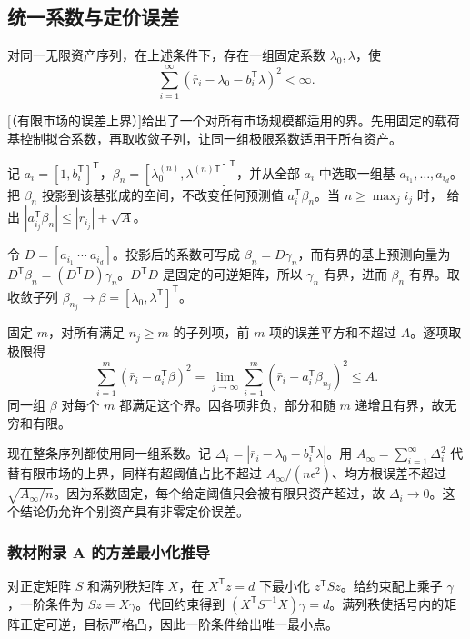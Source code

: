 \subsection{统一系数与定价误差}
\begin{tcolorbox}[knowledge]
 对同一无限资产序列，在上述条件下，存在一组固定系数 $\lambda_0,\lambda$，使
\[
 \sum_{i=1}^\infty(\bar r_i-\lambda_0-b_i^{\mathsf T}\lambda)^2<\infty.
\]
\end{tcolorbox}

[（有限市场的误差上界）]给出了一个对所有市场规模都适用的界。先用固定的载荷基控制拟合系数，再取收敛子列，让同一组极限系数适用于所有资产。

\begin{solution}[label-content={证明},blank-type=none]
记 $a_i=[1,b_i^{\mathsf T}]^{\mathsf T}$，$\beta_n=[\lambda_0^{(n)},\lambda^{(n)\mathsf T}]^{\mathsf T}$，并从全部 $a_i$ 中选取一组基 $a_{i_1},\ldots,a_{i_d}$。把 $\beta_n$ 投影到该基张成的空间，不改变任何预测值 $a_i^{\mathsf T}\beta_n$。当 $n\ge\max_j i_j$ 时， 给出 $|a_{i_j}^{\mathsf T}\beta_n|\le|\bar r_{i_j}|+\sqrt A$。

令 $D=[a_{i_1}\ \cdots\ a_{i_d}]$。投影后的系数可写成 $\beta_n=D\gamma_n$，而有界的基上预测向量为 $D^{\mathsf T}\beta_n=(D^{\mathsf T}D)\gamma_n$。$D^{\mathsf T}D$ 是固定的可逆矩阵，所以 $\gamma_n$ 有界，进而 $\beta_n$ 有界。取收敛子列 $\beta_{n_j}\to\beta=[\lambda_0,\lambda^{\mathsf T}]^{\mathsf T}$。

固定 $m$，对所有满足 $n_j\ge m$ 的子列项，前 $m$ 项的误差平方和不超过 $A$。逐项取极限得
\[
 \sum_{i=1}^m(\bar r_i-a_i^{\mathsf T}\beta)^2
 =\lim_{j\to\infty}\sum_{i=1}^m(\bar r_i-a_i^{\mathsf T}\beta_{n_j})^2\le A.
\]
同一组 $\beta$ 对每个 $m$ 都满足这个界。因各项非负，部分和随 $m$ 递增且有界，故无穷和有限。
\end{solution}

现在整条序列都使用同一组系数。记 $\Delta_i=|\bar r_i-\lambda_0-b_i^{\mathsf T}\lambda|$。用 $A_\infty=\sum_{i=1}^{\infty}\Delta_i^2$ 代替有限市场的上界，同样有超阈值占比不超过 $A_\infty/(n\epsilon^2)$、均方根误差不超过 $\sqrt{A_\infty/n}$。因为系数固定，每个给定阈值只会被有限只资产超过，故 $\Delta_i\to0$。这个结论仍允许个别资产具有非零定价误差。

\subsubsection{教材附录 A 的方差最小化推导}
\begin{tcolorbox}[knowledge,title={等式约束下的二次最小化}]
对正定矩阵 $S$ 和满列秩矩阵 $X$，在 $X^{\mathsf T}z=d$ 下最小化 $z^{\mathsf T}Sz$。给约束配上乘子 $\gamma$，一阶条件为 $Sz=X\gamma$。代回约束得到 $(X^{\mathsf T}S^{-1}X)\gamma=d$。满列秩使括号内的矩阵正定可逆，目标严格凸，因此一阶条件给出唯一最小点。
\end{tcolorbox}

